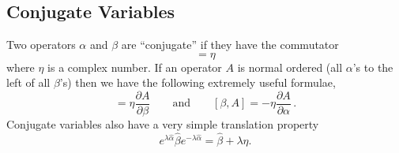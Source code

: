 \subsection{Conjugate Variables}

Two operators $\alpha$ and $\beta$ are ``conjugate'' if they have the commutator
\begin{equation}
  [\alpha,\beta]=\eta
\end{equation}
where $\eta$ is a complex number.
If an operator $A$ is normal ordered (all $\alpha$'s to the left of all $\beta$'s) then we have the following extremely useful formulae,
\begin{equation}
  [\alpha,A] = \eta\frac{\partial A}{\partial\beta}
  \qquad\textrm{and}\qquad
  [\beta,A]=-\eta\frac{\partial A}{\partial\alpha}
  \, .
\end{equation}
Conjugate variables also have a very simple translation property
\begin{equation}
  e^{\lambda \hat{\alpha}}\hat{\beta}e^{-\lambda \hat{\alpha}}=\hat{\beta} + \lambda \eta.
\end{equation}
